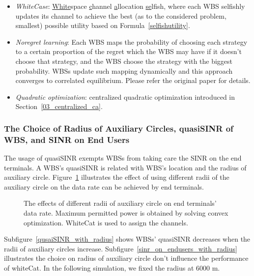 \begin{itemize}
\item \textit{WhiteCase}:  \underline{White}space \underline{c}hannel \underline{a}llocation \underline{se}lfish, where each WBS selfishly updates its channel to achieve the best (as to the considered problem, smallest) possible utility based on Formula~\ref{selfishutility}.

\item \textit{Noregret learning}: Each WBS maps the probability of choosing each strategy to a certain proportion of the regret which the WBS may have if it doesn't choose that strategy, and the WBS choose the strategy with the biggest probability.  
WBSs update such mapping dynamically and this approach converges to correlated equilibrium. 
Please refer the original paper \cite{hart00correlatedeq} for details.
		
\item \textit{Quadratic optimization}: centralized quadratic optimization introduced in Section~\ref{03_centralized_ca}.
\end{itemize}


\subsubsection*{The Choice of Radius of Auxiliary Circles, quasiSINR of WBS, and SINR on End Users}
The usage of quasiSINR exempts WBSs from taking care the SINR on the end terminals.
A WBS's quasiSINR is related with WBS's location and the radius of auxiliary circle.
Figure~\ref{radius} illustrates the effect of using different radii of the auxiliary circle on the data rate can be achieved by end terminals.

\begin{figure}[h]
\centering
{}
\caption[]{The effects of different radii of auxiliary circle on end terminals' data rate. Maximum permitted power is obtained by solving convex optimization. WhiteCat is used to assign the channels.}
\label{radius}
\end{figure}

Subfigure~\ref{qusaiSINR_with_radius} shows WBSs' quasiSINR decreases when the radii of auxiliary circles increase.
Subfigure~\ref{sinr_on_endusers_with_radius} illustrates the choice on radius of auxiliary circle don't influence the performance of whiteCat.
In the following simulation, we fixed the radius at 6000 m.

